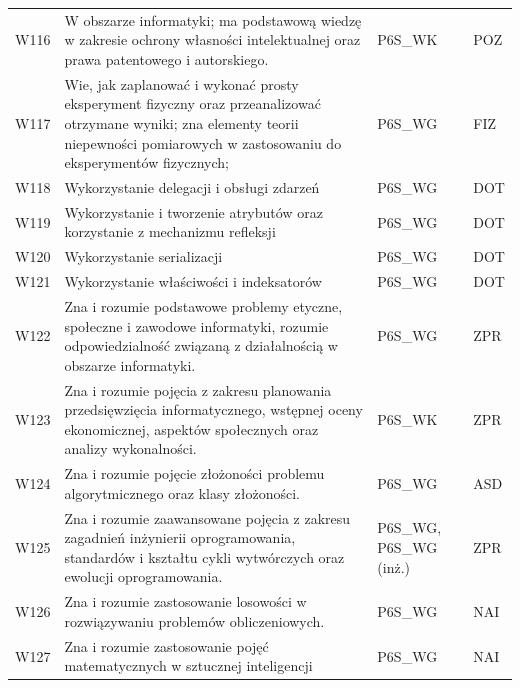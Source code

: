 \documentclass[12pt,a4paper]{article}
\begin{document}
{\begin{longtable}{m{1cm}m{8.8cm}m{2.1cm}m{2.5cm}}
\rowcolor{tableRowAlt} W116 & W obszarze informatyki; ma podstawową wiedzę w zakresie ochrony własności intelektualnej oraz prawa patentowego i autorskiego. & {\scriptsize P6S\_WK} & {\scriptsize POZ} \\
\rowcolor{tableRowLight} W117 & Wie, jak zaplanować i wykonać prosty eksperyment fizyczny oraz przeanalizować otrzymane wyniki; zna elementy teorii niepewności pomiarowych w zastosowaniu do eksperymentów fizycznych; & {\scriptsize P6S\_WG} & {\scriptsize FIZ} \\
\rowcolor{tableRowAlt} W118 & Wykorzystanie delegacji i obsługi zdarzeń & {\scriptsize P6S\_WG} & {\scriptsize DOT} \\
\rowcolor{tableRowLight} W119 & Wykorzystanie i tworzenie atrybutów oraz korzystanie z mechanizmu refleksji & {\scriptsize P6S\_WG} & {\scriptsize DOT} \\
\rowcolor{tableRowAlt} W120 & Wykorzystanie serializacji & {\scriptsize P6S\_WG} & {\scriptsize DOT} \\
\rowcolor{tableRowLight} W121 & Wykorzystanie właściwości i indeksatorów & {\scriptsize P6S\_WG} & {\scriptsize DOT} \\
\rowcolor{tableRowAlt} W122 & Zna i rozumie podstawowe problemy etyczne, społeczne i zawodowe informatyki, rozumie odpowiedzialność związaną z działalnością w obszarze informatyki. & {\scriptsize P6S\_WG} & {\scriptsize ZPR} \\
\rowcolor{tableRowLight} W123 & Zna i rozumie pojęcia z zakresu planowania przedsięwzięcia informatycznego, wstępnej oceny ekonomicznej, aspektów społecznych oraz analizy wykonalności. & {\scriptsize P6S\_WK} & {\scriptsize ZPR} \\
\rowcolor{tableRowAlt} W124 & Zna i rozumie pojęcie złożoności problemu algorytmicznego oraz klasy złożoności. & {\scriptsize P6S\_WG} & {\scriptsize ASD} \\
\rowcolor{tableRowLight} W125 & Zna i rozumie zaawansowane pojęcia z zakresu zagadnień inżynierii oprogramowania, standardów i kształtu cykli wytwórczych oraz ewolucji oprogramowania. & {\scriptsize P6S\_WG, P6S\_WG {\scriptsize (inż.)}} & {\scriptsize ZPR} \\
\rowcolor{tableRowAlt} W126 & Zna i rozumie zastosowanie losowości w rozwiązywaniu problemów obliczeniowych. & {\scriptsize P6S\_WG} & {\scriptsize NAI} \\
\rowcolor{tableRowLight} W127 & Zna i rozumie zastosowanie pojęć matematycznych w sztucznej inteligencji & {\scriptsize P6S\_WG} & {\scriptsize NAI} \\

\end{longtable}}
\end{document}
